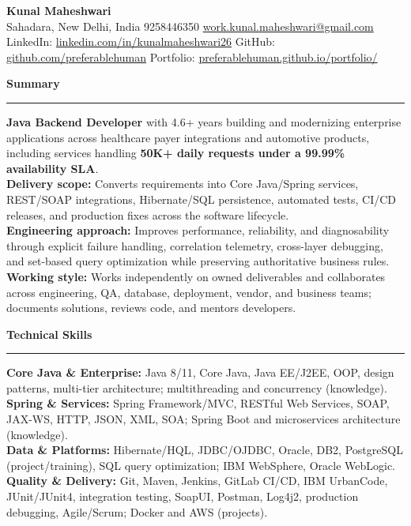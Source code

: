 \documentclass[11pt,letterpaper]{article}
\newcommand{\ressection}[1]{\Needspace{6\baselineskip}\vspace{8pt}\par\textbf{#1}\par\vspace{2pt}\hrule\vspace{5pt}}
\begin{document}
\pagestyle{empty}\raggedright\fontsize{11}{12.5}\selectfont

{\Large \textbf{Kunal Maheshwari}}\\
Sahadara, New Delhi, India \textbar{} 9258446350 \textbar{} \href{mailto:work.kunal.maheshwari@gmail.com}{work.kunal.maheshwari@gmail.com}\\
LinkedIn: \href{https://www.linkedin.com/in/kunalmaheshwari26}{linkedin.com/in/kunalmaheshwari26} \textbar{} GitHub: \href{https://github.com/preferablehuman}{github.com/preferablehuman} \textbar{} Portfolio: \href{https://preferablehuman.github.io/portfolio/}{preferablehuman.github.io/portfolio/}

\ressection{Summary}
\textbf{Java Backend Developer} with 4.6+ years building and modernizing enterprise applications across healthcare payer integrations and automotive products, including services handling \textbf{50K+ daily requests under a 99.99\% availability SLA}.\\[2pt]
\textbf{Delivery scope:} Converts requirements into Core Java/Spring services, REST/SOAP integrations, Hibernate/SQL persistence, automated tests, CI/CD releases, and production fixes across the software lifecycle.\\[2pt]
\textbf{Engineering approach:} Improves performance, reliability, and diagnosability through explicit failure handling, correlation telemetry, cross-layer debugging, and set-based query optimization while preserving authoritative business rules.\\[2pt]
\textbf{Working style:} Works independently on owned deliverables and collaborates across engineering, QA, database, deployment, vendor, and business teams; documents solutions, reviews code, and mentors developers.

\ressection{Technical Skills}
\textbf{Core Java \& Enterprise:} Java 8/11, Core Java, Java EE/J2EE, OOP, design patterns, multi-tier architecture; multithreading and concurrency (knowledge).\\
\textbf{Spring \& Services:} Spring Framework/MVC, RESTful Web Services, SOAP, JAX-WS, HTTP, JSON, XML, SOA; Spring Boot and microservices architecture (knowledge).\\
\textbf{Data \& Platforms:} Hibernate/HQL, JDBC/OJDBC, Oracle, DB2, PostgreSQL (project/training), SQL query optimization; IBM WebSphere, Oracle WebLogic.\\
\textbf{Quality \& Delivery:} Git, Maven, Jenkins, GitLab CI/CD, IBM UrbanCode, JUnit/JUnit4, integration testing, SoapUI, Postman, Log4j2, production debugging, Agile/Scrum; Docker and AWS (projects).
\end{document}

